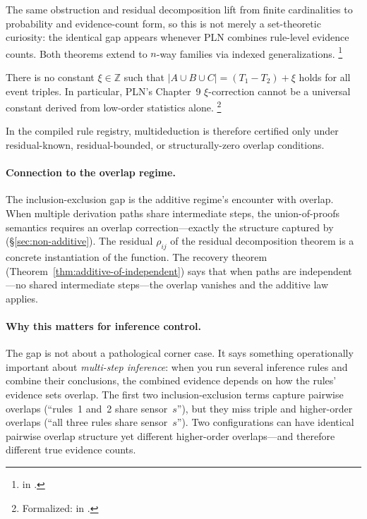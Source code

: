 \documentclass[11pt,openany]{report}
\begin{document}
\noindent
The same obstruction and residual decomposition lift from finite
cardinalities to probability and evidence-count form, so this is
not merely a set-theoretic curiosity: the identical gap appears
whenever PLN combines rule-level evidence counts.
Both theorems extend to $n$-way families via indexed
generalizations.%
\footnote{
in .}

\begin{corollary}
\label{cor:no-universal-xi}
There is no constant $\xi \in \mathbb{Z}$ such that
$|A \cup B \cup C| = (T_1 - T_2) + \xi$
holds for all event triples.  In particular, PLN's Chapter~9
$\xi$-correction cannot be a universal constant derived from
low-order statistics alone.%
\footnote{Formalized:
in .}
\end{corollary}

\noindent
In the compiled rule registry, multideduction is therefore
certified only under residual-known, residual-bounded, or
structurally-zero overlap conditions.

\paragraph{Connection to the overlap regime.}
The inclusion-exclusion gap is the additive regime's encounter
with overlap.  When multiple derivation paths share intermediate
steps, the union-of-proofs semantics requires an overlap
correction---exactly the structure captured by
(\S\ref{sec:non-additive}).  The residual $\rho_{ij}$ of the
residual decomposition theorem is a concrete instantiation of the
 function.  The recovery theorem
(Theorem~\ref{thm:additive-of-independent}) says that when paths
are independent---no shared intermediate steps---the overlap
vanishes and the additive law applies.

\paragraph{Why this matters for inference control.}
The gap is not about a pathological corner case.  It says
something operationally important about \emph{multi-step inference}:
when you run several inference rules and combine their conclusions,
the combined evidence depends on how the rules' evidence sets
overlap.  The first two inclusion-exclusion terms capture pairwise
overlaps (``rules~1 and~2 share sensor~$s$''), but they miss triple
and higher-order overlaps (``all three rules share sensor~$s$'').
Two configurations can have identical pairwise overlap structure
yet different higher-order overlaps---and therefore different true
evidence counts.
\end{document}
